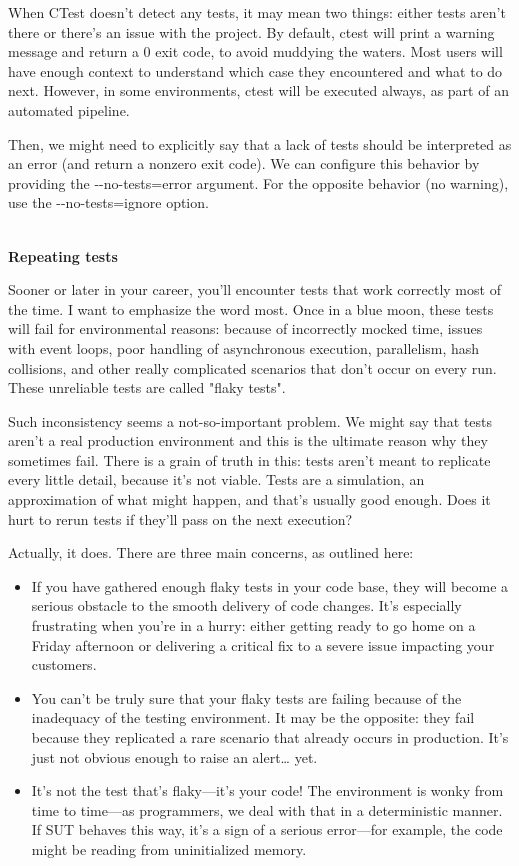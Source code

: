 When CTest doesn't detect any tests, it may mean two things: either tests aren't there or there's an issue with the project. By default, ctest will print a warning message and return a 0 exit code, to avoid muddying the waters. Most users will have enough context to understand which case they encountered and what to do next. However, in some environments, ctest will be executed always, as part of an automated pipeline.

Then, we might need to explicitly say that a lack of tests should be interpreted as an error (and return a nonzero exit code). We can configure this behavior by providing the -{}-no-tests=error argument. For the opposite behavior (no warning), use the -{}-no-tests=ignore option.

\hspace*{\fill} \\ %
\noindent
\textbf{Repeating tests}

Sooner or later in your career, you'll encounter tests that work correctly most of the time. I want to emphasize the word most. Once in a blue moon, these tests will fail for environmental reasons: because of incorrectly mocked time, issues with event loops, poor handling of asynchronous execution, parallelism, hash collisions, and other really complicated scenarios that don't occur on every run. These unreliable tests are called "flaky tests".

Such inconsistency seems a not-so-important problem. We might say that tests aren't a real production environment and this is the ultimate reason why they sometimes fail. There is a grain of truth in this: tests aren't meant to replicate every little detail, because it's not viable. Tests are a simulation, an approximation of what might happen, and that's usually good enough. Does it hurt to rerun tests if they'll pass on the next execution?

Actually, it does. There are three main concerns, as outlined here:

\begin{itemize}
\item 
If you have gathered enough flaky tests in your code base, they will become a serious obstacle to the smooth delivery of code changes. It's especially frustrating when you're in a hurry: either getting ready to go home on a Friday afternoon or delivering a critical fix to a severe issue impacting your customers.

\item 
You can't be truly sure that your flaky tests are failing because of the inadequacy of the testing environment. It may be the opposite: they fail because they replicated a rare scenario that already occurs in production. It's just not obvious enough to raise an alert… yet.

\item 
It's not the test that's flaky—it's your code! The environment is wonky from time to time—as programmers, we deal with that in a deterministic manner. If SUT behaves this way, it's a sign of a serious error—for example, the code might be reading from uninitialized memory.
\end{itemize}

